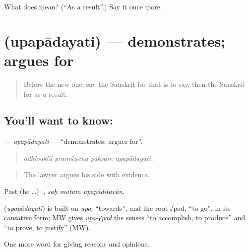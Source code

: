 \begin{tcolorbox}[breakable,colback=teal!4,colframe=teal!35!black,title={Before you move on}]
What does  mean? (\textquotedblleft{}As a result\textquotedblright{}.) Say it once more.
\end{tcolorbox}
\section[\texorpdfstring{\sk{उपपादयति} (upapādayati)}{उपपादयति (upapādayati)}]{ (upapādayati) — demonstrates; argues for}

\label{lesson:SA-C342-upapadayati}



\begin{quote}
Before the new one: say the Sanskrit for that is to say, then the Sanskrit for as a result.
\end{quote}

\subsection*{You'll want to know: }
\textbf{} — \emph{upapādayati} — \textquotedblleft{}demonstrates; argues for\textquotedblright{}.

\begin{quote}
   
\end{quote}

\begin{quote}
\emph{adhivaktā pramāṇena pakṣam upapādayati.}
\end{quote}

\begin{quote}
The lawyer argues his side with evidence.
\end{quote}

Past (he …):   , \emph{saḥ matam upapāditavān}.

\begin{cousinweb}
\textbf{} (\emph{upapādayati}) is built on \emph{upa}, \textquotedblleft{}towards\textquotedblright{}, and the root √pad, \textquotedblleft{}to go\textquotedblright{}, in its causative form; MW gives \emph{upa-√pad} the senses \textquotedblleft{}to accomplish, to produce\textquotedblright{} and \textquotedblleft{}to prove, to justify\textquotedblright{} (MW).
\end{cousinweb}

\begin{grammarlens}[title={What you've built}]
One more word for giving reasons and opinions.
\end{grammarlens}

